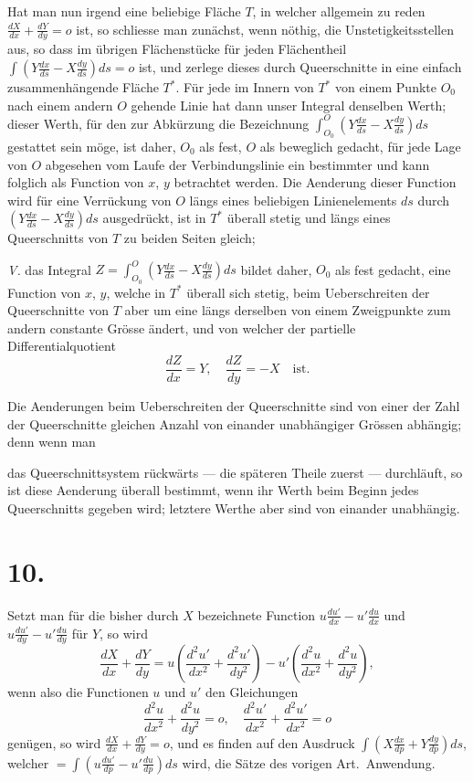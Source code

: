 \documentclass{article}
\begin{document}
Hat man nun irgend eine beliebige Fläche $T$, in welcher allgemein zu reden $\frac{dX}{dx} + \frac{dY}{dy} = o$ ist, so schliesse man zunächst, wenn nöthig, die Unstetigkeitsstellen aus, so dass im übrigen Flächenstücke für jeden Flächentheil $\displaystyle\int \left(Y\frac{dx}{ds} - X\frac{dy}{ds}\right) ds = o$ ist, und zerlege dieses durch Queerschnitte in eine einfach zusammenhängende Fläche $T^*$. Für jede im Innern von $T^*$ von einem Punkte $O_0$ nach einem andern $O$ gehende Linie hat dann unser Integral denselben Werth; dieser Werth, für den zur Abkürzung die Bezeichnung $\displaystyle\int_{O_0}^O \left(Y\frac{dx}{ds} - X\frac{dy}{ds}\right) ds$ gestattet sein möge, ist daher, $O_0$ als fest, $O$ als beweglich gedacht, für jede Lage von $O$ abgesehen vom Laufe der Verbindungslinie ein bestimmter und kann folglich als Function von $x$, $y$ betrachtet werden. Die Aenderung dieser Function wird für eine Verrückung von $O$ längs eines beliebigen Linienelements $ds$ durch $\left(Y\frac{dx}{ds} - X\frac{dy}{ds}\right) ds$ ausgedrückt, ist in $T^*$ überall stetig und längs eines Queerschnitts von $T$ zu beiden Seiten gleich;

\emph{V.} das Integral $Z = \displaystyle\int_{O_0}^O \left(Y\frac{dx}{ds} - X\frac{dy}{ds}\right) ds$ bildet daher, $O_0$ als fest gedacht, eine Function von $x$, $y$, welche in $T^*$ überall sich stetig, beim Ueberschreiten der Queerschnitte von $T$ aber um eine längs derselben von einem Zweigpunkte zum andern constante Grösse ändert, und von welcher der partielle Differentialquotient
\[
\frac{dZ}{dx} = Y, \quad \frac{dZ}{dy} = -X \quad \text{ist.}
\]

Die Aenderungen beim Ueberschreiten der Queerschnitte sind von einer der Zahl der Queerschnitte gleichen Anzahl von einander unabhängiger Grössen abhängig; denn wenn man

das Queerschnittsystem rückwärts --- die späteren Theile zuerst --- durchläuft, so ist diese Aenderung überall bestimmt, wenn ihr Werth beim Beginn jedes Queerschnitts gegeben wird; letztere Werthe aber sind von einander unabhängig.

\section*{10.}

Setzt man für die bisher durch $X$ bezeichnete Function $u\frac{du'}{dx} - u'\frac{du}{dx}$ und $u\frac{du'}{dy} - u'\frac{du}{dy}$ für $Y$, so wird
\[
\frac{dX}{dx} + \frac{dY}{dy} = u\left(\frac{d^2u'}{dx^2} + \frac{d^2u'}{dy^2}\right) - u'\left(\frac{d^2u}{dx^2} + \frac{d^2u}{dy^2}\right),
\]
wenn also die Functionen $u$ und $u'$ den Gleichungen
\[
\frac{d^2u}{dx^2} + \frac{d^2u}{dy^2} = o, \quad \frac{d^2u'}{dx^2} + \frac{d^2u'}{dx^2} = o
\]
genügen, so wird $\frac{dX}{dx} + \frac{dY}{dy} = o$, und es finden auf den Ausdruck $\displaystyle\int \left(X\frac{dx}{dp} + Y\frac{dy}{dp}\right) ds$, welcher $= \displaystyle\int \left(u\frac{du'}{dp} - u'\frac{du}{dp}\right) ds$ wird, die Sätze des vorigen Art.\ Anwendung.
\end{document}
